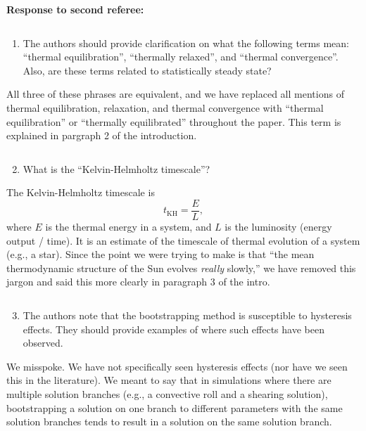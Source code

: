 \documentclass[aps, 11pt, singlecolumn]{revtex4-1} %
\begin{document}
\begin{singlespace}
\newpage
\noindent
\Large{\textbf{Response to second referee:}}\newline$\,$\newline\indent
\begin{myquotation}
$\,$\\\vspace{-1.25cm}
\begin{enumerate}
\item The authors should provide clarification on what the following terms mean: ``thermal equilibration'', ``thermally relaxed'', and ``thermal convergence''. Also, are these terms related to statistically steady state?
\end{enumerate}
\end{myquotation}
All three of these phrases are equivalent, and we have replaced all mentions of
thermal equilibration, relaxation, and thermal convergence with ``thermal
equilibration'' or ``thermally equilibrated'' throughout the paper. This term
is explained in pargraph 2 of the introduction.
\begin{myquotation}
$\,$\\\vspace{-1.25cm}
\begin{enumerate}
\setcounter{enumi}{1}
\item What is the ``Kelvin-Helmholtz timescale''?
\end{enumerate}
\end{myquotation}
The Kelvin-Helmholtz timescale is 
$$
t_{\text{KH}} = \frac{E}{L},
$$
where $E$ is the thermal energy in a system, and $L$ is the luminosity
(energy output / time). It is an estimate of the timescale
of thermal evolution of a system 
(e.g., a star). Since the point we were trying to make is that ``the mean 
thermodynamic structure of the Sun evolves \emph{really} slowly,''
we have removed this jargon and said this more clearly in paragraph 3 of the intro.

\begin{myquotation}
$\,$\\\vspace{-1.25cm}
\begin{enumerate}
\setcounter{enumi}{2}
\item The authors note that the bootstrapping method is susceptible to hysteresis effects. They should provide examples of where such effects have been observed.
\end{enumerate}
\end{myquotation}
We misspoke. We have not specifically seen hysteresis effects (nor have we seen
this in the literature).  We meant to say that in simulations where there are
multiple solution branches (e.g., a convective roll and a shearing solution),
bootstrapping a solution on one branch to different parameters with the same
solution branches tends to result in a solution on the 
same solution branch. 


\end{singlespace}
\end{document}
